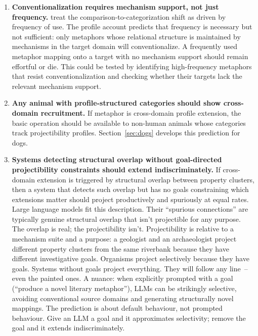 \documentclass[12pt]{article}
\begin{document}
\begin{enumerate}
\item \textbf{Conventionalization requires mechanism support, not just frequency.} \textcite{bowdle2005} treat the comparison-to-categorization shift as driven by frequency of use. The profile account predicts that frequency is necessary but not sufficient: only metaphors whose relational structure is maintained by mechanisms in the target domain will conventionalize. A frequently used metaphor mapping onto a target with no mechanism support should remain effortful or die. This could be tested by identifying high-frequency metaphors that resist conventionalization and checking whether their targets lack the relevant mechanism support.

\item \textbf{Any animal with profile-structured categories should show cross-domain recruitment.} If metaphor is cross-domain profile extension, the basic operation should be available to non-human animals whose categories track projectibility profiles. Section~\ref{sec:dogs} develops this prediction for dogs.

\item \textbf{Systems detecting structural overlap without goal-directed projectibility constraints should extend indiscriminately.} If cross-domain extension is triggered by structural overlap between property clusters, then a system that detects such overlap but has no goals constraining which extensions matter should project productively and spuriously at equal rates. Large language models fit this description. Their \enquote{spurious connections} are typically genuine structural overlap that isn't projectible for any purpose. The overlap is real; the projectibility isn't. Projectibility is relative to a mechanism suite and a purpose: a geologist and an archaeologist project different property clusters from the same riverbank because they have different investigative goals. Organisms project selectively because they have goals. Systems without goals project everything. They will follow any line~-- even the painted ones. A nuance: when explicitly prompted with a goal (\enquote{produce a novel literary metaphor}), LLMs can be strikingly selective, avoiding conventional source domains and generating structurally novel mappings. The prediction is about default behaviour, not prompted behaviour. Give an LLM a goal and it approximates selectivity; remove the goal and it extends indiscriminately.
\end{enumerate}
\end{document}
